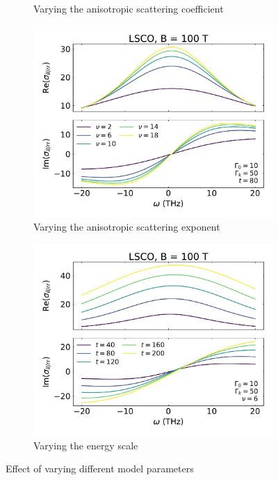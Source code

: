 \begin{figure}
\begin{subfigure}{0.495\textwidth}
        \caption{Varying the anisotropic scattering coefficient}
        \label{fig:vary_gamma_k}
    \end{subfigure}
    \begin{subfigure}{0.495\textwidth}
        \includegraphics[width=\textwidth]{figures/vary_power}
        \caption{Varying the anisotropic scattering exponent}
        \label{fig:vary_power}
    \end{subfigure}
    \begin{subfigure}{0.495\textwidth}
        \includegraphics[width=\textwidth]{figures/vary_energy_scale}
        \caption{Varying the energy scale}
        \label{fig:vary_energy_scale}
    \end{subfigure}
    \caption{Effect of varying different model parameters}
    \label{fig:vary_parameters}
\end{figure}


